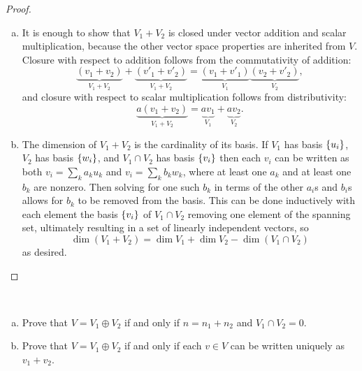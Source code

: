 \documentclass{article}
\begin{document}
\begin{proof} ~
  \begin{enumerate}[(a)]
    \item It is enough to show that $V_1 + V_2$ is closed under vector addition
    and scalar multiplication, because the other vector space properties are
    inherited from $V$. Closure with respect to addition follows from the
    commutativity of addition: \[
      \underbrace{(v_1 + v_2)}_{V_1 + V_2} +
      \underbrace{(v'_1 + v'_2)}_{V_1 + V_2} =
      \underbrace{(v_1 + v'_1)}_{V_1}
      \underbrace{(v_2 + v'_2)}_{V_2},
    \] and closure with respect to scalar multiplication follows from
    distributivity: \[
      \underbrace{a(v_1 + v_2)}_{V_1 + V_2} =
      \underbrace{av_1}_{V_1}
      +
      \underbrace{av_2}_{V_2}.
    \]

    \item %
    The dimension of $V_1 + V_2$ is the cardinality of its basis.
    If $V_1$ has basis $\left\{ u_i \right\}$, $V_2$ has basis $\left\{ w_i \right\}$, and
    $V_1 \cap V_2$ has basis $\left\{ v_i \right\}$ then each $v_i$ can be written as both
    $v_i = \sum_k a_ku_k$ and
    $v_i = \sum_k b_kw_k$, where at least one $a_k$ and at least one $b_k$ are nonzero.
    Then solving for one such $b_k$ in terms of the other $a_i$s and $b_i$s
    allows for $b_k$ to be removed from the basis. This can be done inductively
    with each element the basis $\left\{ v_i \right\}$ of $V_1 \cap V_2$ removing one
    element of the spanning set, ultimately resulting in a set of linearly
    independent vectors, so \[
      \dim(V_1 + V_2) = \dim V_1 + \dim V_2 - \dim(V_1 \cap V_2)
    \] as desired.
  \end{enumerate}
\end{proof}
\begin{problem}{2} ~
  \begin{enumerate}[(a)]
    \item Prove that $V = V_1 \oplus V_2$ if and only if $n = n_1 + n_2$ and $V_1 \cap V_2 = 0$.
    \item Prove that $V = V_1 \oplus V_2$ if and only if each $v \in V$ can be
    written uniquely as $v_1 + v_2$.
  \end{enumerate}
\end{problem}
\end{document}
